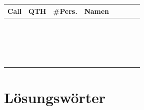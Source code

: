 \documentclass[a4paper,10pt]{article}
\begin{document}
    \begin{center}
    \renewcommand{\arraystretch}{1.5}
    \begin{tabular}{|l|c|l|c|c|c|l|l|}\hline
        \textbf{Call} & \textbf{QTH} & \textbf{\#Pers.} & \textbf{Namen} \\ \hline \hline
        \hspace{1cm} & \hspace{1cm} & & \hspace{10cm} \\ \hline
         & & &  \\ \hline
         & & &  \\ \hline
         & & &  \\ \hline
         & & &  \\ \hline
         & & &  \\ \hline
         & & &  \\ \hline
         & & &  \\ \hline
         & & &  \\ \hline
         & & &  \\ \hline
         & & &  \\ \hline
         & & &  \\ \hline
         & & &  \\ \hline
         & & &  \\ \hline
         & & &  \\ \hline
         & & &  \\ \hline
         & & &  \\ \hline
         & & &  \\ \hline
         & & &  \\ \hline
    \end{tabular}
    \end{center}

\section{Lösungswörter}
\end{document}
